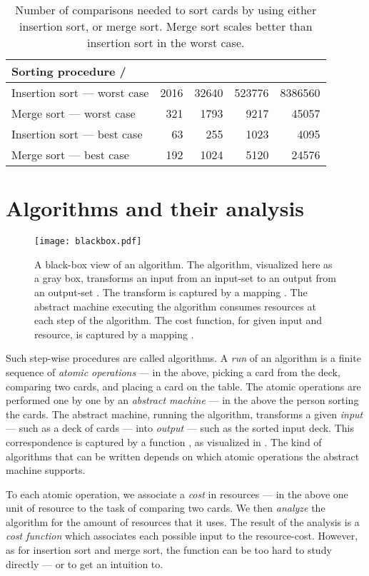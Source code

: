 \documentclass[b5paper, english, oneside]{memoir}
\begin{document}
\begin{table}
\begin{tabular}{|l|r|r|r|r|}
\hline 
Sorting procedure /  &  &  &  & \\
\hline 
Insertion sort --- worst case & 2016 & 32640 & 523776 & 8386560 \\
Merge sort --- worst case & 321 & 1793 & 9217 & 45057 \\
Insertion sort --- best case & 63 & 255 & 1023 & 4095 \\
Merge sort --- best case & 192 & 1024 & 5120 & 24576 \\
\hline 
\end{tabular}
\centering
\caption{Number of comparisons needed to sort  cards by using either insertion sort, or merge sort. Merge sort scales better than insertion sort in the worst case.}
\label{PlayingCardComparisons}
\end{table}

\section{Algorithms and their analysis}

\begin{figure}
\centering
\texttt{[image: blackbox.pdf]}
\caption{A black-box view of an algorithm. The algorithm, visualized here as a gray box, transforms an input  from an input-set  to an output  from an output-set . The transform is captured by a mapping . The abstract machine executing the algorithm consumes resources at each step of the algorithm. The cost function, for given input and resource, is captured by a mapping .}
\label{AlgorithmBlackbox}
\end{figure}

Such step-wise procedures are called algorithms. A \emph{run} of an algorithm is a finite sequence of \emph{atomic operations} --- in the above, picking a card from the deck, comparing two cards, and placing a card on the table. The atomic operations are performed one by one by an \emph{abstract machine} --- in the above the person sorting the cards. The abstract machine, running the algorithm, transforms a given \emph{input} --- such as a deck of cards --- into \emph{output} --- such as the sorted input deck. This correspondence is captured by a function , as visualized in . The kind of algorithms that can be written depends on which atomic operations the abstract machine supports.

To each atomic operation, we associate a \emph{cost} in resources --- in the above one unit of resource to the task of comparing two cards. We then \emph{analyze} the algorithm for the amount of resources that it uses. The result of the analysis is a \emph{cost function}  which associates each possible input to the resource-cost. However, as for insertion sort and merge sort, the function  can be too hard to study directly --- or to get an intuition to. 
\end{document}
